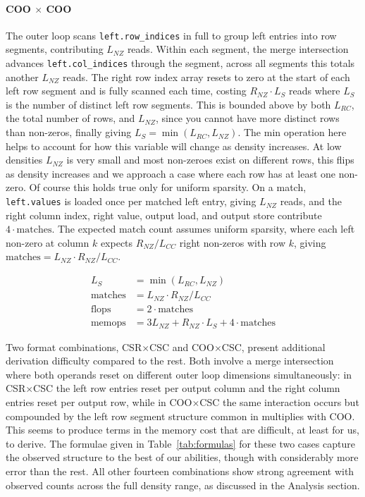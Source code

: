 \documentclass[sigconf]{acmart}
\begin{document}
\paragraph{COO $\times$ COO}
The outer loop scans \texttt{left.row\_indices} in full to group left entries into row segments,
contributing $L_{NZ}$ reads. Within each segment, the merge intersection advances
\texttt{left.col\_indices} through the segment, across all segments this totals
another $L_{NZ}$ reads. The right row index array resets to zero at the start of each left row
segment and is fully scanned each time, costing $R_{NZ} \cdot L_S$ reads where $L_S$ is the
number of distinct left row segments. This is bounded above by both $L_{RC}$, the total number
of rows, and $L_{NZ}$, since you cannot have more distinct rows than non-zeros, finally giving
$L_S = \min(L_{RC}, L_{NZ})$. The min operation here helps to account for how this variable will change as density increases. At low densities $L_{NZ}$ is very small and most non-zeroes exist on different rows, this flips as density increases and we approach a case where each row has at least one non-zero. Of course this holds true only for uniform sparsity. On a match, \texttt{left.values} is loaded once per matched left
entry, giving $L_{NZ}$ reads, and the right column index, right value, output load, and output
store contribute $4 \cdot \text{matches}$. The expected match count assumes uniform sparsity,
where each left non-zero at column $k$ expects $R_{NZ} / L_{CC}$ right non-zeros with row $k$,
giving $\text{matches} = L_{NZ} \cdot R_{NZ} / L_{CC}$.

\begin{align}
L_S &= \min(L_{RC}, L_{NZ}) \\
\text{matches} &= L_{NZ} \cdot R_{NZ} / L_{CC} \\
\text{flops}  &= 2 \cdot \text{matches} \\
\text{memops} &= 3L_{NZ} + R_{NZ} \cdot L_S + 4 \cdot \text{matches}
\end{align}

Two format combinations, CSR$\times$CSC and COO$\times$CSC, present additional derivation
difficulty compared to the rest. Both involve a merge intersection where both operands
reset on different outer loop dimensions simultaneously: in CSR$\times$CSC the left row entries
reset per output column and the right column entries reset per output row, while in
COO$\times$CSC the same interaction occurs but compounded by the left row segment
structure common in multiplies with COO. This seems to produce terms in the memory
cost that are difficult, at least for us, to derive. The formulae given in
Table~\ref{tab:formulas} for these two cases capture the observed structure to the best
of our abilities, though with considerably more error than the rest. All other
fourteen combinations show strong agreement with observed counts across the full density range,
as discussed in the Analysis section.
\end{document}
